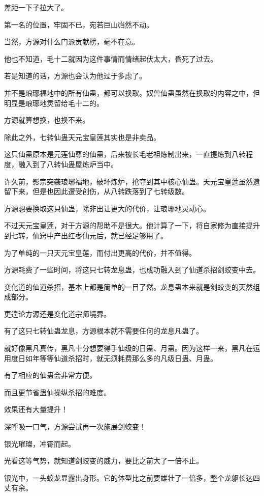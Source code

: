 \begin{this_body}
差距一下子拉大了。

第一名的位置，牢固不已，宛若巨山岿然不动。

当然，方源对什么门派贡献榜，毫不在意。

他也不知道，毛十二就因为这件事情而情绪起伏太大，昏死了过去。

若是知道的话，方源也会认为他过于多虑了。

并不是琅琊福地中的所有仙蛊，都可以换取。奴兽仙蛊虽然在换取的内容之中，但明显是琅琊地灵留给毛十二的。

方源就算想换，也换不来。

除此之外，七转仙蛊天元宝皇莲其实也是非卖品。

这只仙蛊原本是元莲仙尊的仙蛊，后来被长毛老祖炼制出来，一直提炼到八转程度，融入到了八转仙蛊屋炼炉当中。

许久前，影宗突袭琅琊福地，破坏炼炉，抢夺到其中核心仙蛊。天元宝皇莲虽然遗留下来，但是也因此遭受创伤，从八转跌落到了七转级数。

方源想要换取这只仙蛊，除非出让更大的代价，让琅琊地灵动心。

不过天元宝皇莲，对于方源的帮助不是很大。他计算了一下，将自家修为直接提升到七转，仙窍中产出红枣仙元后，就已经足够用了。

为了单纯的一只天元宝皇莲，而付出更高的代价，并不值得。

方源耗费了一些时间，将这只七转龙息蛊，也成功融入到了仙道杀招剑蛟变中去。

变化道的仙道杀招，基本上都是简单的一目了然。龙息蛊本来就是剑蛟变的天然组成部分。

更遑论方源还是变化道宗师境界。

有了这只七转仙蛊龙息，方源根本就不需要任何的龙息凡蛊了。

就好像黑凡真传，黑凡十分想要得手仙级的日蛊、月蛊。因为这样一来，黑凡在运用度日如年等等仙道杀招时，就无须耗费那么多的凡级日蛊、月蛊。

有了相应的仙蛊会非常方便。

而且更节省蛊仙操纵杀招的难度。

效果还有大量提升！

深呼吸一口气，方源尝试再一次施展剑蛟变！

银光璀璨，冲霄而起。

光看这等气势，就知道剑蛟变的威力，要比之前大了一倍不止。

银光中，一头蛟龙显露出身形。它的体型比之前要雄壮了一倍多，整个龙躯长达四丈有余。


\end{this_body}
